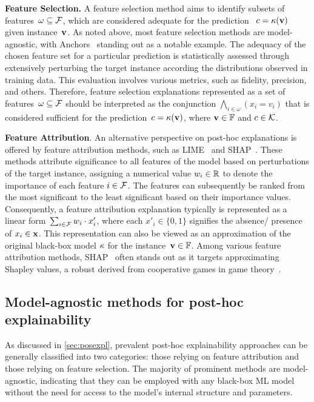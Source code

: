\textbf{Feature Selection.} 
A feature selection method aims to identify subsets of features~$\omega \subseteq {\mathcal{F}}$, which are
considered adequate for the prediction~ $c = \kappa(\mathbf{v})$ given instance~$\mathbf{v}$.
%
As noted above, most feature selection methods are model-agnostic, with
Anchors~\cite{guestrin-aaai18} standing out as a notable example.
%
The adequacy of the chosen feature set for a particular prediction is statistically assessed through
extensively perturbing the target instance according the distributions observed in training data.
%
This evaluation involves various metrics, such as fidelity, precision, and others.
%
Therefore, feature selection explanations represented as a set of 
features~$\omega \subseteq {\mathcal{F}}$ should be interpreted as the conjunction
$\bigwedge_{i\in\omega}{(x_i=v_i)}$ that is considered sufficient for the prediction~$c = \kappa(\mathbf{v})$, where $\mathbf{v} \in \mathbb{F}$ and $c \in {\mathcal{K}}$.


\textbf{Feature Attribution}. 
An alternative perspective on post-hoc explanations is offered by feature attribution 
methods, such as LIME~\cite{guestrin-kdd16} and SHAP~\cite{lundberg-nips17}. 
%
These methods attribute significance to all features of the model based 
on perturbations of the target instance, assigning a numerical value $w_i \in \mathbb{R}$
to denote the importance of each feature $i \in {\mathcal{F}}$.
%
The features can subsequently be ranked from the most significant to the
least significant based on their importance values.
%
Consequently, a feature attribution explanation typically is represented as a linear
form~$\sum_{i\in{\mathcal{F}}}{w_i\cdot x'_i}$, where each $x'_i \in \{0, 1\}$ signifies the absence/ presence of $x_i \in \mathbf{x}$. 
%
This representation can also be viewed as an approximation of the original black-box model $\kappa$ for the instance~$\mathbf{v} \in \mathbb{F}$.
%
Among various feature attribution methods, SHAP~\cite{lundberg-nips17,barcelo-aaai21,barcelo-corr21}
often stands out as it targets approximating Shapley values, a robust derived from cooperative games in game theory~\cite{shapley-ctg53}.

\subsection{Model-agnostic methods for post-hoc explainability}

As discussed in \autoref{sec:posexpl}, prevalent post-hoc explainability 
approaches can be generally classified into two categories: 
those relying on feature attribution and those relying on feature selection.
%
The majority of prominent methods are model-agnostic, indicating that they can be 
employed with any black-box ML model without the need for access to the model's 
internal structure and parameters.

